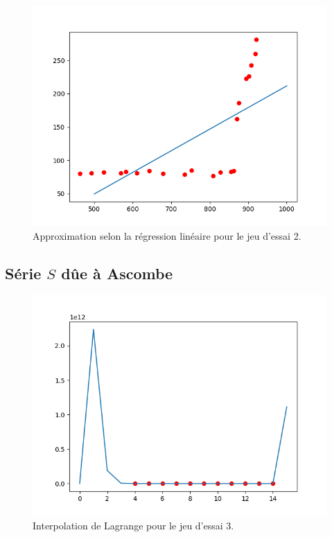 \documentclass[12pt,french,titlepage]{article}
\begin{document}
		\begin{figure}[H]
		\includegraphics[width=\textwidth]{"23.png"}
		\caption{Approximation selon la régression linéaire pour le jeu d'essai 2.}
		\end{figure}
		
	\subsection{Série $S$ dûe à Ascombe}
		\begin{figure}[H]
		\includegraphics[width=\textwidth]{"31.png"}
		\caption{Interpolation de Lagrange pour le jeu d'essai 3.}
		\end{figure}
		
\end{document}
